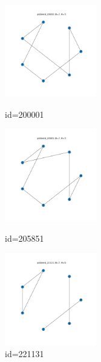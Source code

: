 \documentclass[a4paper, 10pt, dvipdfmx]{jlreq}
\begin{document}
\begin{figure}[htbp]
  \begin{minipage}{0.33\hsize}
    \begin{center}
      \includegraphics[width=40mm]{./img_5/problem4_200001.png}
    \end{center}
    \caption{id=200001}
  \end{minipage}
  \begin{minipage}{0.33\hsize}
    \begin{center}
      \includegraphics[width=40mm]{./img_5/problem4_205851.png}
    \end{center}
    \caption{id=205851}
  \end{minipage}
  \begin{minipage}{0.33\hsize}
    \begin{center}
      \includegraphics[width=40mm]{./img_5/problem4_221131.png}
    \end{center}
    \caption{id=221131}
  \end{minipage}
\end{figure}
\end{document}

